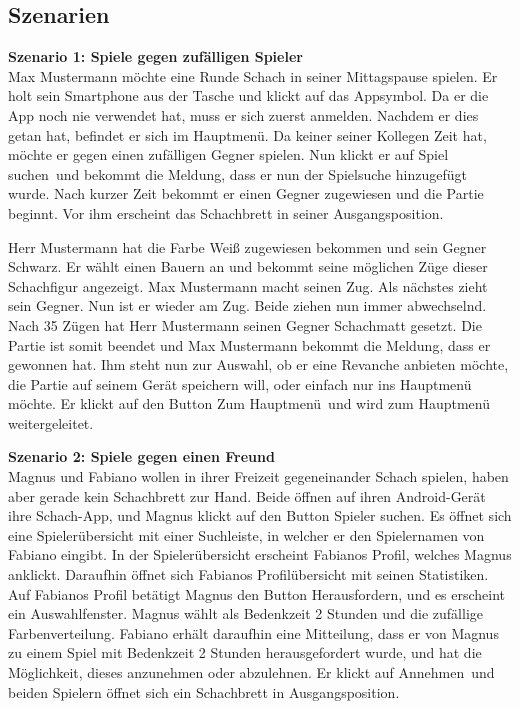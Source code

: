 \documentclass[parskip=full]{scrartcl}
\begin{document}
\subsection{Szenarien}
\textbf{Szenario 1: \glqq Spiele gegen zufälligen Spieler\grqq} \\
Max Mustermann möchte eine Runde \gls{Schach} in seiner Mittagspause spielen. Er holt sein \gls{Smartphone} aus der Tasche und klickt auf das Appsymbol.
Da er die App noch nie verwendet hat, muss er sich zuerst anmelden. Nachdem er dies getan hat, befindet er sich im Hauptmenü.
Da keiner seiner Kollegen Zeit hat, möchte er gegen einen zufälligen Gegner spielen. Nun klickt er auf \glqq Spiel suchen\grqq\ und bekommt die Meldung, dass er nun der Spielsuche hinzugefügt wurde.
Nach kurzer Zeit bekommt er einen Gegner zugewiesen und die Partie beginnt. Vor ihm erscheint das \gls{Schachbrett} in seiner \gls{Ausgangsposition}.

Herr Mustermann hat die Farbe Weiß zugewiesen bekommen und sein Gegner Schwarz. Er wählt einen Bauern an und bekommt seine möglichen Züge dieser \gls{Schachfigur} angezeigt.
Max Mustermann macht seinen Zug. Als nächstes zieht sein Gegner. Nun ist er wieder am Zug. Beide ziehen nun immer abwechselnd. Nach 35 Zügen hat Herr Mustermann
seinen Gegner \gls{Schachmatt} gesetzt. Die Partie ist somit beendet und Max Mustermann bekommt die Meldung, dass er gewonnen hat. Ihm steht nun zur Auswahl, ob er eine Revanche anbieten möchte, die Partie auf seinem Gerät speichern will, oder einfach nur ins Hauptmenü möchte. Er klickt auf den Button \glqq Zum Hauptmenü\grqq\ und wird zum Hauptmenü weitergeleitet.

\textbf{Szenario 2: \glqq Spiele gegen einen Freund\grqq} \\
Magnus und Fabiano wollen in ihrer Freizeit gegeneinander Schach spielen, haben aber gerade kein Schachbrett zur Hand. Beide öffnen auf ihren \gls{Android}-Gerät ihre Schach-App, und Magnus klickt auf den Button \glqq Spieler suchen\grqq. Es öffnet sich eine Spielerübersicht mit einer Suchleiste, in welcher er den Spielernamen von Fabiano eingibt. In der Spielerübersicht erscheint Fabianos Profil, welches Magnus anklickt. Daraufhin öffnet sich Fabianos Profilübersicht mit seinen Statistiken. Auf Fabianos Profil betätigt Magnus den Button \glqq Herausfordern\grqq, und es erscheint ein Auswahlfenster. Magnus wählt als \gls{Bedenkzeit} 2 Stunden und die zufällige Farbenverteilung. Fabiano erhält daraufhin eine Mitteilung, dass er von Magnus zu einem Spiel mit \gls{Bedenkzeit} 2 Stunden herausgefordert wurde, und hat die Möglichkeit, dieses anzunehmen oder abzulehnen. Er klickt auf \glqq Annehmen\grqq\ und beiden Spielern öffnet sich ein \gls{Schachbrett} in \gls{Ausgangsposition}.
\end{document}
